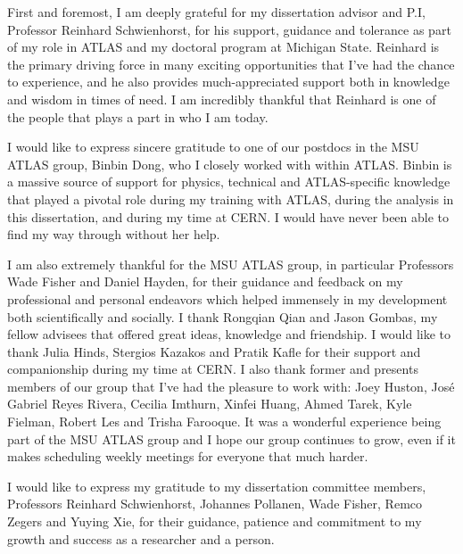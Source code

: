\documentclass{msuphddissertation}
\begin{document}
\begin{acknowledgment}

First and foremost, I am deeply grateful for my dissertation advisor and P.I, Professor Reinhard Schwienhorst, for his support, guidance and tolerance as part of my role in ATLAS and my doctoral program at Michigan State. Reinhard is the primary driving force in many exciting opportunities that I've had the chance to experience, and he also provides much-appreciated support both in knowledge and wisdom in times of need. I am incredibly thankful that Reinhard is one of the people that plays a part in who I am today.

I would like to express sincere gratitude to one of our postdocs in the MSU ATLAS group, Binbin Dong, who I closely worked with within ATLAS. Binbin is a massive source of support for physics, technical and ATLAS-specific knowledge that played a pivotal role during my training with ATLAS, during the analysis in this dissertation, and during my time at CERN. I would have never been able to find my way through without her help.

I am also extremely thankful for the MSU ATLAS group, in particular Professors Wade Fisher and Daniel Hayden, for their guidance and feedback on my professional and personal endeavors which helped immensely in my development both scientifically and socially. I thank Rongqian Qian and Jason Gombas, my fellow advisees that offered great ideas, knowledge and friendship. I would like to thank Julia Hinds, Stergios Kazakos and Pratik Kafle for their support and companionship during my time at CERN. I also thank former and presents members of our group that I've had the pleasure to work with: Joey Huston, José Gabriel Reyes Rivera, Cecilia Imthurn, Xinfei Huang, Ahmed Tarek, Kyle Fielman, Robert Les and Trisha Farooque. It was a wonderful experience being part of the MSU ATLAS group and I hope our group continues to grow, even if it makes scheduling weekly meetings for everyone that much harder.

I would like to express my gratitude to my dissertation committee members, Professors Reinhard Schwienhorst, Johannes Pollanen, Wade Fisher, Remco Zegers and Yuying Xie, for their guidance, patience and commitment to my growth and success as a researcher and a person.


\end{acknowledgment}
\end{document}
